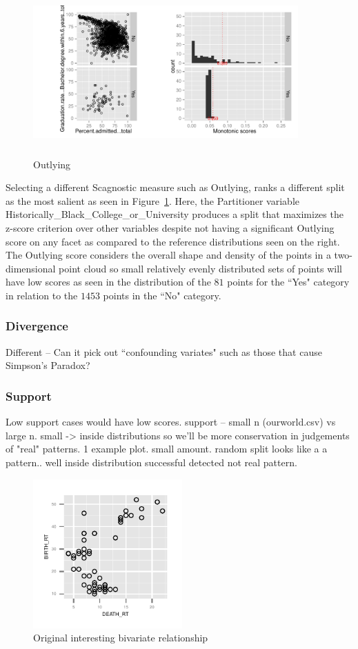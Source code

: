 \begin{figure}
\includegraphics[width=4in,height=2.5in]{images/10_3880027387531-Historically_Black_College_or_University.pdf}
  \caption{Outlying}
 \label{fig:outlying1}
\end{figure}

Selecting a different Scagnostic measure such as Outlying, ranks a different split as the most salient as seen in Figure~\ref{fig:outlying1}. Here, the Partitioner variable Historically\_Black\_College\_or\_University produces a split that maximizes the z-score criterion over other variables despite not having a significant Outlying score on any facet as compared to the reference distributions seen on the right. The Outlying score considers the overall shape and density of the points in a two-dimensional point cloud so small relatively evenly distributed sets of points will have low scores as seen in the distribution of the $81$ points for the ``Yes" category in relation to the $1453$ points in the ``No" category.

\subsubsection{Divergence}
Different -- Can it pick out ``confounding variates" such as those that cause Simpson's Paradox?

\subsubsection{Support}
Low support cases would have low scores.
support -- small n (ourworld.csv) vs large n. small -> inside distributions so we'll be more conservation in judgements of "real" patterns.
 1 example plot. small amount. random split looks like a a pattern.. well inside distribution successful detected not real pattern.
\begin{figure}
 \centering 
\includegraphics[width=2.25in,height=2.25in]{images/BIRTH_RT-DEATH_RT.pdf}
  \caption{Original interesting bivariate relationship}
 \label{fig:original2}
\end{figure}

